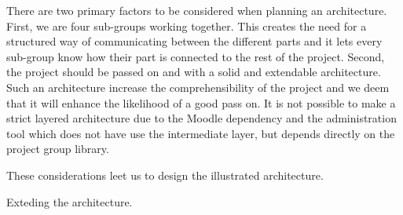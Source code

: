 There are two primary factors to be considered when planning an architecture. 
First, we are four sub-groups working together. 
This creates the need for a structured way of communicating between the different parts and it lets every sub-group know how their part is connected to the rest of the project. 
Second, the project should be passed on and with a solid and extendable architecture. 
Such an architecture increase the comprehensibility of the project and we deem that it will enhance the likelihood of a good pass on.
It is not possible to make a strict layered architecture due to the Moodle dependency and the administration tool which does not have use the intermediate layer, but depends directly on the project group library.

These considerations leet us to design the illustrated architecture.  

Exteding the architecture.













